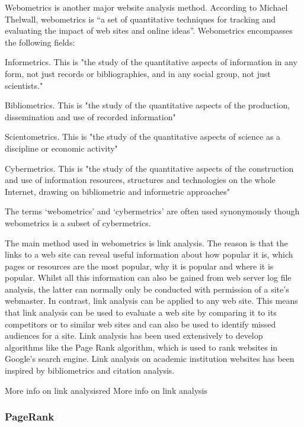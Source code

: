\noindent
Webometrics is another major website analysis method. According to Michael Thelwall, webometrics is “a set of quantitative techniques for tracking and evaluating the impact of web sites and online ideas”. Webometrics encompasses the following fields:
\begin{list}{}{}
\item Informetrics. This is "the study of the quantitative aspects of information in any form, not just records or bibliographies, and in any social group, not just scientists."
\item Bibliometrics. This is "the study of the quantitative aspects of the production, dissemination and use of recorded information"
\item Scientometrics. This is "the study of the quantitative aspects of science as a discipline or
economic activity"
\item Cybermetrics. This is "the study of the quantitative aspects of the construction and use of information resources, structures and technologies on the whole Internet, drawing on bibliometric and informetric approaches"
\end{list}
The terms ‘webometrics’ and ‘cybermetrics’ are often used synonymously though webometrics is a subset of cybermetrics.

\noindent
The main method used in webometrics is link analysis. The reason is that the links to a web site can reveal useful information about how popular it is, which pages or resources are the most popular, why it is popular and where it is popular. Whilst all this information can also be gained from web server log file analysis, the latter can normally only be conducted with permission of a site’s webmaster. In contrast, link analysis can be applied to any web site. This means that link analysis can be used to evaluate a web site by comparing it to its competitors or to similar web sites and can also be used to identify missed audiences for a site. Link analysis has been used extensively to develop algorithms like the Page Rank algorithm, which is used to rank websites in Google’s search engine. Link analysis on academic institution websites has been inspired by bibliometrics and citation analysis.
\begin{review_comment}{More info on link analysis}{red}
{More info on link analysis}
\end{review_comment}
\subsubsection{PageRank}

